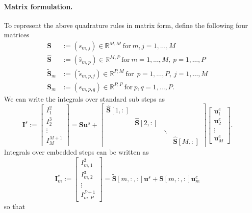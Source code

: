 \documentclass{article}
\newcommand{\ve}[1]{\mathbf{#1}}
\begin{document}
\paragraph{Matrix formulation.}
To represent the above quadrature rules in matrix form, define the following four matrices
\begin{align*}
	\ve{S} &:= \left( s_{m,j} \right) \in \mathbb{R}^{M,M} \ \text{for} \ m,j=1,\ldots,M \\ 
	\hat{\ve{S}} &:= \left( \hat{s}_{m,p} \right) \in \mathbb{R}^{M,P} \ \text{for} \ m=1,\ldots,M, \ p=1,\ldots,P \\
	\tilde{\ve{S}}_m &:= \left( \tilde{s}_{m,p,j} \right) \in \mathbb{R}^{P,M} \ \text{for} \ \ p=1,\ldots,P, \ j=1,\ldots,M \\
	\ve{S}_m &:= \left( s_{m,p,q} \right) \in \mathbb{R}^{P,P} \ \text{for} \ p,q=1,\ldots,P.
\end{align*}
We can write the integrals over standard sub steps as
\begin{equation}
	\ve{I}^s := 
	\begin{bmatrix}
		I_{1}^2 \\ I_2^3 \\ \vdots \\ I_{M}^{M+1}
	\end{bmatrix}
	=
	\ve{S} \ve{u}^s +
	\begin{bmatrix}
		\hat{\ve{S}}[1,:] & & \\ & \hat{\ve{S}}[2,:] \\ & & \ddots \\ & & & \hat{\ve{S}}[M,:] 
	\end{bmatrix}
	\begin{bmatrix}
		\ve{u}^e_1 \\ \ve{u}^e_2 \\ \vdots \\ \ve{u}^{e}_{M}
	\end{bmatrix}.
\end{equation}
Integrals over embedded steps can be written as
\begin{equation}
	\ve{I}^e_m :=
	\begin{bmatrix}
		I_{m,1}^{2} \\ I_{m,2}^{3} \\ \vdots \\ I_{m,P}^{P+1}
	\end{bmatrix}
	=
	\tilde{\ve{S}}[m,:,:] \ve{u}^s + \ve{S}[m,:,:] \ve{u}^e_m
\end{equation}
so that
\end{document}
